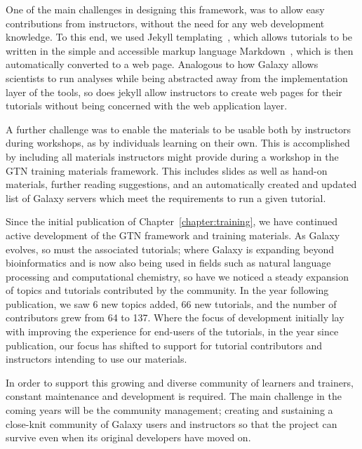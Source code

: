 One of the main challenges in designing this framework, was to allow easy contributions from instructors, without the need for any web development knowledge. To this end, we used Jekyll templating~\cite{jekyll}, which allows tutorials to be written in the simple and accessible markup language Markdown~\cite{markdown}, which is then automatically converted to a web page. Analogous to how Galaxy allows scientists to run analyses while being abstracted away from the implementation layer of the tools, so does jekyll allow instructors to create web pages for their tutorials without being concerned with the web application layer.

A further challenge was to enable the materials to be usable both by instructors during workshops, as by individuals learning on their own. This is accomplished by including all materials instructors might provide during a workshop in the GTN training materials framework. This includes slides as well as hand-on materials, further reading suggestions, and an automatically created and updated list of Galaxy servers which meet the requirements to run a given tutorial.

\begin{comment}
<closer integration with galaxy servers>

<feedback, planemo, cofests, dashboard, instructor topic, levels, translations, tess search, curricula, toc>

2019: 4 new topics (metabolomics, computational chemistry, data manipulation, ui and features), 66 new tutorials
\end{comment}

Since the initial publication of Chapter~\ref{chapter:training}, we have continued active development of the GTN framework and training materials. As Galaxy evolves, so must the associated tutorials; where Galaxy is expanding beyond bioinformatics and is now also being used in fields such as natural language processing and computational chemistry, so have we noticed a steady expansion of topics and tutorials contributed by the community. In the year following publication, we saw 6 new topics added, 66 new tutorials, and the number of contributors grew from 64 to 137. Where the focus of development initially lay with improving the experience for end-users of the tutorials, in the year since publication, our focus has shifted to support for tutorial contributors and instructors intending to use our materials.

In order to support this growing and diverse community of learners and trainers, constant maintenance and development is required. The main challenge in the coming years will be the community management; creating and sustaining a close-knit community of Galaxy users and instructors so that the project can survive even when its original developers have moved on.



